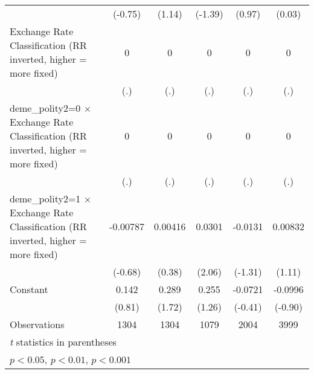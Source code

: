 {\begin{tabular}{l*{5}{c}}
                &  (-0.75)         &   (1.14)         &  (-1.39)         &   (0.97)         &   (0.03)         \\
[1em]
Exchange Rate Classification (RR inverted, higher = more fixed)&        0         &        0         &        0         &        0         &        0         \\
                &      (.)         &      (.)         &      (.)         &      (.)         &      (.)         \\
[1em]
deme\_polity2=0 $\times$ Exchange Rate Classification (RR inverted, higher = more fixed)&        0         &        0         &        0         &        0         &        0         \\
                &      (.)         &      (.)         &      (.)         &      (.)         &      (.)         \\
[1em]
deme\_polity2=1 $\times$ Exchange Rate Classification (RR inverted, higher = more fixed)& -0.00787         &  0.00416         &   0.0301\sym{*}  &  -0.0131         &  0.00832         \\
                &  (-0.68)         &   (0.38)         &   (2.06)         &  (-1.31)         &   (1.11)         \\
[1em]
Constant        &    0.142         &    0.289         &    0.255         &  -0.0721         &  -0.0996         \\
                &   (0.81)         &   (1.72)         &   (1.26)         &  (-0.41)         &  (-0.90)         \\
\hline
Observations    &     1304         &     1304         &     1079         &     2004         &     3999         \\
\hline\hline
\multicolumn{6}{l}{\footnotesize \textit{t} statistics in parentheses}\\
\multicolumn{6}{l}{\footnotesize \sym{*} \(p<0.05\), \sym{**} \(p<0.01\), \sym{***} \(p<0.001\)}\\
\end{tabular}
}
